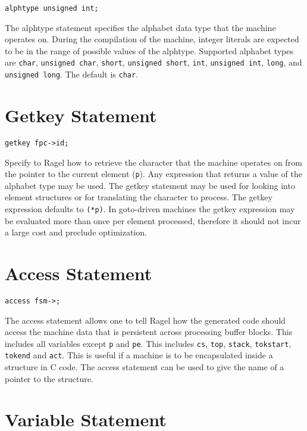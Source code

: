 \documentclass[letterpaper,11pt,oneside]{book}
\newcommand{\verbspace}{\vspace{10pt}}
\begin{document}
\begin{verbatim}
alphtype unsigned int;
\end{verbatim}
\verbspace

The alphtype statement specifies the alphabet data type that the machine
operates on. During the compilation of the machine, integer literals are expected to
be in the range of possible values of the alphtype.  Supported alphabet types
are \verb|char|, \verb|unsigned char|, \verb|short|, \verb|unsigned short|,
\verb|int|, \verb|unsigned int|, \verb|long|, and \verb|unsigned long|. 
The default is \verb|char|.

\section{Getkey Statement}

\begin{verbatim}
getkey fpc->id;
\end{verbatim}
\verbspace

Specify to Ragel how to retrieve the character that the machine operates on
from the pointer to the current element (\verb|p|). Any expression that returns
a value of the alphabet type
may be used. The getkey statement may be used for looking into element
structures or for translating the character to process. The getkey expression
defaults to \verb|(*p)|. In goto-driven machines the getkey expression may be
evaluated more than once per element processed, therefore it should not incur a
large cost and preclude optimization.

\section{Access Statement}

\begin{verbatim}
access fsm->;
\end{verbatim}
\verbspace

The access statement allows one to tell Ragel how the generated code should
access the machine data that is persistent across processing buffer blocks.
This includes all variables except \verb|p| and \verb|pe|. This includes
\verb|cs|, \verb|top|, \verb|stack|, \verb|tokstart|, \verb|tokend| and \verb|act|.
This is useful if a machine is to be encapsulated inside a
structure in C code. The access statement can be used to give the name of
a pointer to the structure.

\section{Variable Statement}
\end{document}
